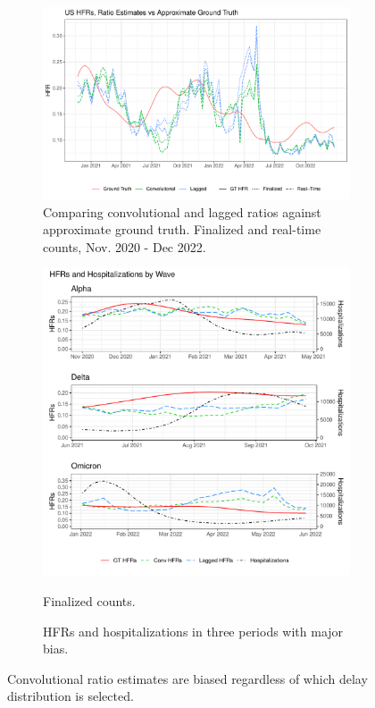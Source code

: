 \documentclass{article}
\begin{document}
\begin{figure}
     \centering
     \begin{subfigure}[b]{0.55\linewidth}
         \centering
         \includegraphics[width=\linewidth]{Figs/Real/US_ests_realtime.pdf}
         \caption{Comparing convolutional and lagged ratios against approximate ground truth. Finalized and real-time counts, Nov. 2020 - Dec 2022.}
         \label{fig:basic_est_vs_gt}
     \end{subfigure}
     \hfill
     \begin{subfigure}[b]{0.4\linewidth}
         \centering
         \includegraphics[width=\linewidth]{Figs/Real/hfrs_by_wave.pdf}
         \caption{HFRs and hospitalizations in three periods with major bias.} Finalized counts.
         \label{fig:wave}
     \end{subfigure}
        \caption{Convolutional ratio estimates are biased regardless of which delay distribution is selected.}
        \label{fig:basic_est_vs_gt_figs}
\end{figure}
\end{document}
